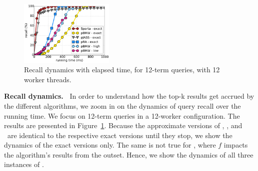 {{\begin{figure}[hbt]
\centering
{}
         \includegraphics[width=0.4\textwidth]{figures/cumulative_12threads_clueweb.pdf}
       \caption{Recall dynamics with elapsed time, for 12-term queries, with 12 worker threads.}
       \label{fig:dynamics}
\end{figure}

{\bf Recall dynamics.\ } 
In order to understand how the top-k results get accrued by the different algorithms, we zoom in on the dynamics of query 
recall over the running time. We focus on 12-term queries in a 12-worker configuration. The results are presented in 
Figure~\ref{fig:dynamics}.
Because the approximate versions of \alg, \pRA, and \pJASS\ are  identical to the respective exact versions until they stop, 
we show the dynamics of the exact versions only.  The same is not true for \pBMW, where $f$ impacts the algorithm's results from the outset.
Hence, we show the dynamics of all three instances of \pBMW. 

}}
